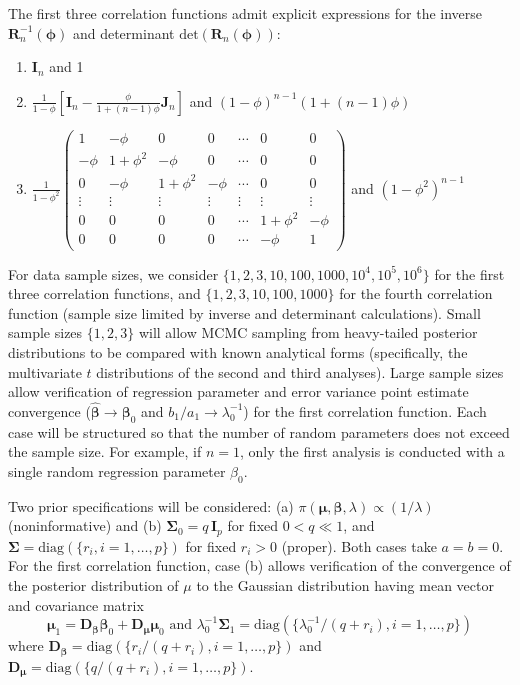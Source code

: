 \documentclass[11pt, oneside]{article}   	%
\begin{document}
The first three correlation functions admit explicit expressions for the inverse $\mathbf{R}_n^{-1}(\mathbf{\phi})$ and determinant $\mbox{det} \left( \mathbf{R}_n(\mathbf{\phi}) \right)$:
\begin{enumerate}
\item $\mathbf{I}_n$ and 1
\item $ \frac{1}{1-\phi} \left[ \mathbf{I}_n - \frac{\phi}{1+(n-1)\phi} \mathbf{J}_n \right]$ and $(1-\phi)^{n-1}(1+(n-1)\phi)$
\item $\frac{1}{1-\phi^2} \left(
\begin{array}{ccccccc}
1 & -\phi & 0 & 0 & \cdots & 0 & 0\\
-\phi & 1+\phi^2 & -\phi & 0 & \cdots & 0 & 0\\
0 & -\phi & 1+\phi^2 & -\phi & \cdots & 0 & 0\\
\vdots & \vdots & \vdots & \vdots & \vdots & \vdots & \vdots \\
0 & 0 & 0 & 0 & \cdots & 1+\phi^2 & -\phi \\
0 & 0 & 0 & 0 & \cdots & -\phi & 1
\end{array} \right)$ and $(1-\phi^2)^{n-1}$
\end{enumerate}

For data sample sizes, we consider $\{ 1,2,3,10,100,1000,10^4,10^5,10^6\}$ for the first three correlation functions, and $\{ 1,2,3,10,100,1000\}$ for the fourth correlation function (sample size limited by inverse and determinant calculations).  Small sample sizes $\{ 1,2,3 \}$ will allow MCMC sampling from heavy-tailed posterior distributions to be compared with known analytical forms (specifically, the multivariate $t$ distributions of the second and third analyses).  Large sample sizes allow verification of regression parameter and error variance point estimate convergence ($\hat{\mathbf{\beta}} \rightarrow \mathbf{\beta}_0$ and $b_1/a_1 \rightarrow \lambda_0^{-1}$) for the first correlation function.  Each case will be structured so that the number of random parameters does not exceed the sample size.  For example, if $n=1$, only the first analysis is conducted with a single random regression parameter $\beta_0$.

Two prior specifications will be considered:  (a) $\pi(\mathbf{\mu}, \mathbf{\beta}, \lambda) \propto (1/\lambda)$ (noninformative) and (b) $\mathbf{\Sigma}_0 = q \, \mathbf{I}_p$ for fixed $0 < q \ll 1$, and $\mathbf{\Sigma} = \mbox{diag}(\{ r_i, i=1,\ldots,p \})$ for fixed $r_i > 0$ (proper).  Both cases take $a = b = 0$.  For the first correlation function, case (b) allows verification of the convergence of the posterior distribution of $\mu$ to the Gaussian distribution having mean vector and covariance matrix
\[
\mathbf{\mu}_1 = \mathbf{D}_{\mathbf{\beta}} \mathbf{\beta}_0 + \mathbf{D}_{\mathbf{\mu}} \mathbf{\mu}_0 \mbox{ and } \lambda_0^{-1} \mathbf{\Sigma}_1 = \mbox{diag}( \{ \lambda_0^{-1}/(q+r_i), i=1,\ldots, p \})
\]
where $\mathbf{D}_{\mathbf{\beta}} = \mbox{diag}( \{ r_i/(q+r_i), i=1,\ldots, p \})$ and $\mathbf{D}_{\mathbf{\mu}} = \mbox{diag}( \{ q/(q+r_i), i=1,\ldots, p \})$.
\end{document}
